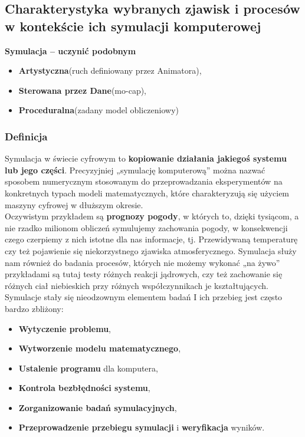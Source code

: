 \subsection{Charakterystyka wybranych zjawisk i procesów w kontekście ich symulacji komputerowej}

\centerline{\textbf{Symulacja – uczynić podobnym}}

\begin{itemize}
	\item \textbf{Artystyczna}(ruch definiowany przez Animatora),
	\item \textbf{Sterowana przez Dane}(mo-cap),
	\item \textbf{Proceduralna}(zadany model obliczeniowy)
\end{itemize}

\subsubsection{Definicja}

Symulacja w świecie cyfrowym to \textbf{kopiowanie działania jakiegoś systemu lub jego części}. Precyzyjniej „symulację komputerową” można nazwać sposobem numerycznym stosowanym do przeprowadzania eksperymentów na konkretnych typach modeli matematycznych, które charakteryzują się użyciem maszyny cyfrowej w dłuższym okresie. \\

Oczywistym przykładem są \textbf{prognozy pogody}, w których to, dzięki tysiącom, a nie rzadko milionom obliczeń symulujemy zachowania pogody, w konsekwencji czego czerpiemy z nich istotne dla nas informacje, tj. Przewidywaną temperaturę czy też pojawienie się niekorzystnego zjawiska atmosferycznego. Symulacja służy nam również do badania procesów, których nie możemy wykonać „na żywo” przykładami są tutaj testy różnych reakcji jądrowych, czy też zachowanie się różnych ciał niebieskich przy różnych współczynnikach je kształtujących. \\

Symulacje stały się nieodzownym elementem badań I ich przebieg jest często bardzo zbliżony:

\begin{itemize}
	\item \textbf{Wytyczenie problemu},
	\item \textbf{Wytworzenie modelu matematycznego},
	\item \textbf{Ustalenie programu} dla komputera,
	\item \textbf{Kontrola bezbłędności systemu},
	\item \textbf{Zorganizowanie badań symulacyjnych},
	\item \textbf{Przeprowadzenie przebiegu symulacji} i \textbf{weryfikacja} wyników. \\
\end{itemize}

